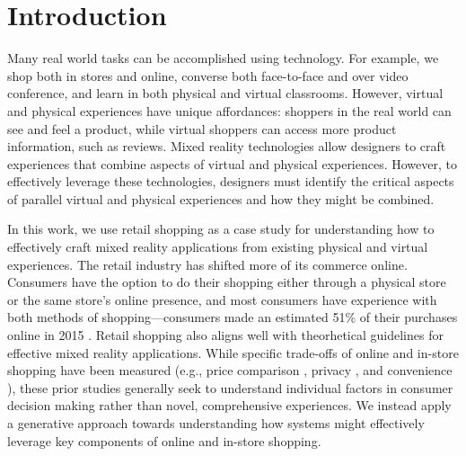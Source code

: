 \section{Introduction}

Many real world tasks can be accomplished using technology. For example, we shop both in stores and online, converse both face-to-face and over video conference, and learn in both physical and virtual classrooms.  However, virtual and physical experiences have unique affordances: shoppers in the real world can see and feel a product, while virtual shoppers can access more product information, such as reviews. Mixed reality technologies allow designers to craft experiences that combine aspects of virtual and physical experiences. However, to effectively leverage these technologies, designers must identify the critical aspects of parallel virtual and physical experiences and how they might be combined. 

In this work, we use retail shopping as a case study for understanding how to effectively craft mixed reality applications from existing physical and virtual experiences. The retail industry has shifted more of its commerce online.  Consumers have the option to do their shopping either through a physical store or the same store's online presence, and most consumers have experience with both methods of shopping---consumers made an estimated 51\% of their purchases online in 2015 \cite{}.  Retail shopping also aligns well with theorhetical guidelines for effective mixed reality applications.  While specific trade-offs of online and in-store shopping have been measured (e.g., price comparison \cite{karlsson2005price}, privacy \cite{miyazaki2001consumer}, and convenience \cite{bednarz2010perceptions}), these prior studies generally seek to understand individual factors in consumer decision making rather than novel, comprehensive experiences. We instead apply a generative approach towards understanding how systems might effectively leverage key components of online and in-store shopping. 


